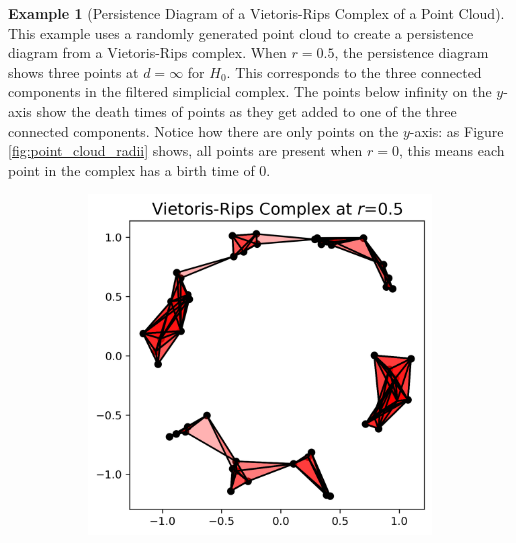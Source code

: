\documentclass[ma]{uncgdissertationexp}
\theoremstyle{plain}
\theoremstyle{definition}
\newtheorem{example}[theorem]{Example}
\theoremstyle{remark}
\begin{document}
\begin{example}[Persistence Diagram of a Vietoris-Rips Complex of a Point Cloud]
This example uses a randomly generated point cloud to create a persistence diagram from a Vietoris-Rips complex. When $r=0.5$, the persistence diagram shows three points at $d=\infty$ for $H_0$. This corresponds to the three connected components in the filtered simplicial complex. The points below infinity on the $y$-axis show the death times of points as they get added to one of the three connected components. Notice how there are only points on the $y$-axis: as Figure \ref{fig:point_cloud_radii} shows, all points are present when $r=0$, this means each point in the complex has a birth time of $0$.
\begin{figure}[H]
    \centering
    \begin{subfigure}[b]{0.45\textwidth}
        \centering
        \includegraphics[width=\textwidth]{point_cloud_plot_r0_5.png}
    \end{subfigure}
    \hfill
    \begin{subfigure}[b]{0.45\textwidth}
        \centering

\end{subfigure}
\end{figure}
\end{example}
\end{document}
